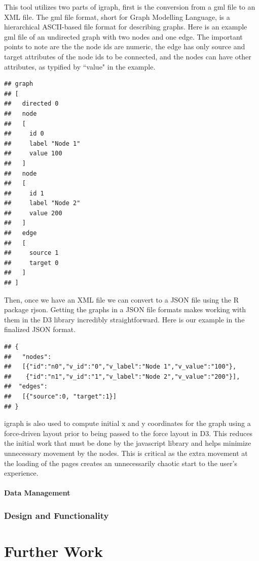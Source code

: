 \documentclass{article}\usepackage{graphicx, color}
\makeatletter
\newenvironment{kframe}{%
 \def\at@end@of@kframe{}%
 \ifinner\ifhmode%
  \def\at@end@of@kframe{\end{minipage}}%
  \begin{minipage}{\columnwidth}%
 \fi\fi%
 \def\FrameCommand##1{\hskip\@totalleftmargin \hskip-\fboxsep
 \colorbox{shadecolor}{##1}\hskip-\fboxsep
     \hskip-\linewidth \hskip-\@totalleftmargin \hskip\columnwidth}%
 \MakeFramed {\advance\hsize-\width
   \@totalleftmargin\z@ \linewidth\hsize
   \@setminipage}}%
 {\par\unskip\endMakeFramed%
 \at@end@of@kframe}
\newenvironment{knitrout}{}{} %
\makeatother
\begin{document}
This tool utilizes two parts of igraph, first is the conversion from a gml file to an XML file. The gml file format, short for Graph Modelling Language, is a hierarchical ASCII-based file format for describing graphs. Here is an example gml file of an undirected graph with two nodes and one edge. The important points to note are the the node ids are numeric, the edge has only source and target attributes of the node ids to be connected, and the nodes can have other attributes, as typified by ``value" in the example.
\begin{knitrout}
\color{fgcolor}\begin{kframe}
\begin{verbatim}
## graph
## [
##   directed 0
##   node
##   [
##     id 0
##     label "Node 1"
##     value 100
##   ]
##   node
##   [
##     id 1
##     label "Node 2"
##     value 200
##   ]
##   edge
##   [
##     source 1
##     target 0
##   ]
## ]
\end{verbatim}
\end{kframe}
\end{knitrout}


Then, once we have an XML file we can convert to a JSON file using the R package rjson\cite{acb-rjson}. Getting the graphs in a JSON file formats makes working with them in the D3 library incredibly straightforward. Here is our example in the finalized JSON format.
\begin{knitrout}
\color{fgcolor}\begin{kframe}
\begin{verbatim}
## {
##   "nodes":
##   [{"id":"n0","v_id":"0","v_label":"Node 1","v_value":"100"}, 
##    {"id":"n1","v_id":"1","v_label":"Node 2","v_value":"200"}], 
##  "edges":
##   [{"source":0, "target":1}]
## }
\end{verbatim}
\end{kframe}
\end{knitrout}



igraph is also used to compute initial x and y coordinates for the graph using a force-driven layout prior to being passed to the force layout in D3. This reduces the initial work that must be done by the javascript library and helps minimize unnecessary movement by the nodes. This is critical as the extra movement at the loading of the pages creates an unnecessarily chaotic start to the user's experience.



\subsection{Data Management}
\section{Design and Functionality}

\part{Further Work}

\printbibliography
\end{document}
